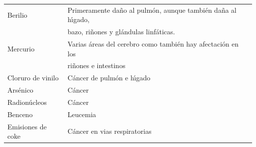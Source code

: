 \begin{table}[htbp]
\begin{center}
{\begin{tabular}{|l|l|}
Berilio  & Primeramente da\~no al pulm\'on, aunque tambi\'en da\~na al h\'{\i}gado,\\ \index{berilio!efectos a la salud}
             &  bazo, ri\~nones y gl\'andulas linf\'aticas.\\ \index{higado@h\'{\i}gado}
Mercurio& Varias \'areas del cerebro como tambi\'en hay afectaci\'on en los \\
                & ri\~nones e intestinos\\ \index{mercurio!efectos a la salud}
Cloruro de vinilo& C\'ancer de pulm\'on e h\'{\i}gado\\ \index{vinilo! cloruro de}
Ars\'enico & C\'ancer\\ \index{arsenico@ars\'enico!efectos a la salud}
Radion\'ucleos& C\'ancer\\ \index{radionucleos@radion\'ucleos!efectos a la salud}
Benceno & Leucemia\\ \index{benceno!efectos a la salud}
Emisiones de coke & C\'ancer en vias respiratorias\\ \hline
\end{tabular}}
\end{center}
\label{efectos}
\end{table}%

\clearpage

 
